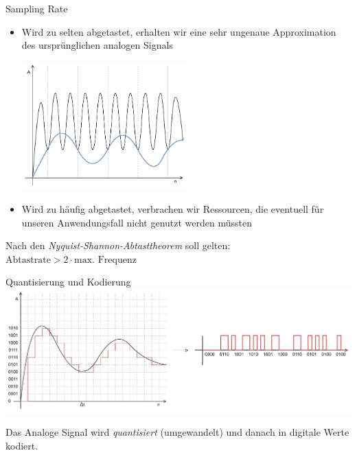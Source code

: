 \begin{defi}{Sampling Rate}
    \begin{itemize}
        \item Wird zu selten abgetastet, erhalten wir eine sehr ungenaue Approximation des ursprünglichen analogen Signals

              \begin{center}
                  \includegraphics[width=0.5\textwidth]{includes/figures/defi_sampling_rate_error.pdf}
              \end{center}
        \item Wird zu häufig abgetastet, verbrachen wir Ressourcen, die eventuell für unseren Anwendungsfall nicht genutzt werden müssten
    \end{itemize}

    Nach den \emph{Nyquist-Shannon-Abtasttheorem} soll gelten: $\text{Abtastrate} > 2 \cdot \text{max. Frequenz}$
\end{defi}

\begin{bonus}{Quantisierung und Kodierung}
    \includegraphics[width=\textwidth]{includes/figures/defi_quantisierung.pdf}

    Das Analoge Signal wird \emph{quantisiert} (umgewandelt) und danach in digitale Werte kodiert.
\end{bonus}

